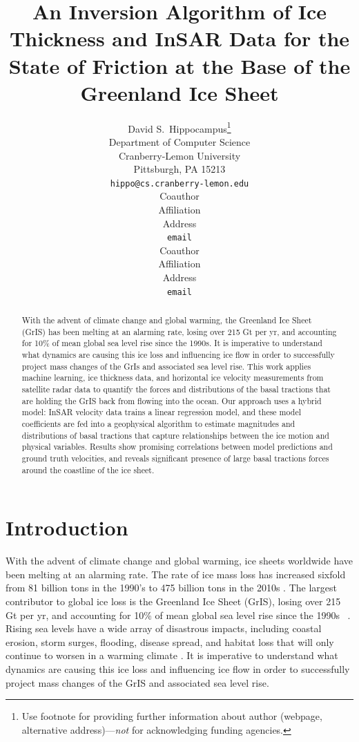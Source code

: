 \documentclass{article}
\title{An Inversion Algorithm of Ice Thickness and InSAR Data for
the State of Friction at the Base of the Greenland Ice Sheet}
\author{%
  David S.~Hippocampus\thanks{Use footnote for providing further information
    about author (webpage, alternative address)---\emph{not} for acknowledging
    funding agencies.} \\
  Department of Computer Science\\
  Cranberry-Lemon University\\
  Pittsburgh, PA 15213 \\
  \texttt{hippo@cs.cranberry-lemon.edu} \\
   \And
   Coauthor \\
   Affiliation \\
   Address \\
   \texttt{email} \\
   \AND
   Coauthor \\
   Affiliation \\
   Address \\
   \texttt{email} \\
}
\begin{document}
\maketitle

\begin{abstract}
With the advent of climate change and global warming, the Greenland Ice Sheet (GrIS) has been melting at an alarming rate, losing over 215 Gt per yr, and accounting for 10\% of mean global sea level rise since the 1990s. It is imperative to understand what dynamics are causing this ice loss and influencing ice flow in order to successfully project mass changes of the GrIs and associated sea level rise. This work applies machine learning, ice thickness data, and horizontal ice velocity measurements from satellite radar data to quantify the forces and distributions of the basal tractions that are holding the GrIS back from flowing into the ocean. Our approach uses a hybrid model: InSAR velocity data trains a linear regression model, and these model coefficients are fed into a geophysical algorithm to estimate magnitudes and distributions of basal tractions that capture relationships between the ice motion and physical variables. Results show promising correlations between model predictions and ground truth velocities, and reveals significant presence of large basal tractions forces around the coastline of the ice sheet.


\end{abstract}

\section{Introduction}

With the advent of climate change and global warming, ice sheets worldwide have been melting at an alarming rate. The rate of ice mass loss has increased sixfold from 81 billion tons in the 1990’s to 475 billion tons in the 2010s \cite{the_imbie_team_mass_2020}. The largest contributor to global ice loss is the Greenland Ice Sheet (GrIS), losing over 215 Gt per yr, and accounting for 10\% of mean global sea level rise since the 1990s ~\cite{stocker_climate_2013}. Rising sea levels have a wide array of disastrous impacts, including coastal erosion, storm surges, flooding, disease spread, and habitat loss that will only continue to worsen in a warming climate \cite{pattyn_greenland_2018}. It is imperative to understand what dynamics are causing this ice loss and influencing ice flow in order to successfully project mass changes of the GrIS and associated sea level rise.
\end{document}
